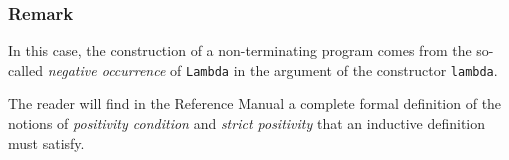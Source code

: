 \documentclass[11pt]{article}
\begin{document}
%


\subsubsection*{Remark} In this case, the construction of a non-terminating
program comes from the so-called \textsl{negative occurrence} of
\texttt{Lambda} in the argument of the constructor \texttt{lambda}.

The reader will find in the Reference Manual a complete formal
definition of the notions of \emph{positivity condition} and
\emph{strict positivity} that an inductive definition must satisfy.
\end{document}
